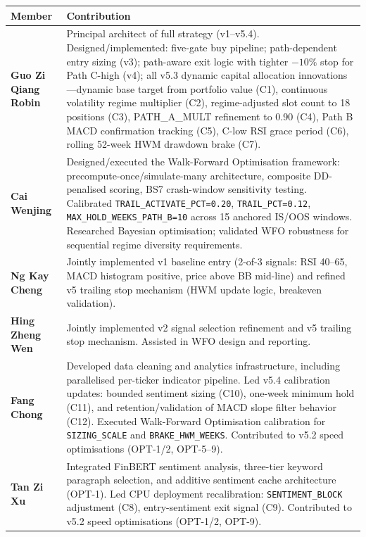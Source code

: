 \documentclass[11pt,twoside,a4paper]{article}
\begin{document}
{\small
\begin{tabular}{>{\raggedright\arraybackslash}p{3.8cm}%
                >{\raggedright\arraybackslash}p{10.5cm}}
\hline
Member & Contribution \\
\hline
\textbf{Guo Zi Qiang Robin} & Principal architect of full strategy (v1--v5.4). Designed/implemented: five-gate buy pipeline; path-dependent entry sizing (v3); path-aware exit logic with tighter $-10\%$ stop for Path C-high (v4); all v5.3 dynamic capital allocation innovations---dynamic base target from portfolio value (C1), continuous volatility regime multiplier (C2), regime-adjusted slot count to 18 positions (C3), PATH\_A\_MULT refinement to 0.90 (C4), Path B MACD confirmation tracking (C5), C-low RSI grace period (C6), rolling 52-week HWM drawdown brake (C7). \\[4pt]
\textbf{Cai Wenjing} & Designed/executed the Walk-Forward Optimisation framework: precompute-once/simulate-many architecture, composite DD-penalised scoring, BS7 crash-window sensitivity testing. Calibrated \texttt{TRAIL\_ACTIVATE\_PCT=0.20}, \texttt{TRAIL\_PCT=0.12}, \texttt{MAX\_HOLD\_WEEKS\_PATH\_B=10} across 15 anchored IS/OOS windows. Researched Bayesian optimisation; validated WFO robustness for sequential regime diversity requirements. \\[4pt]
\textbf{Ng Kay Cheng} & Jointly implemented v1 baseline entry (2-of-3 signals: RSI 40--65, MACD histogram positive, price above BB mid-line) and refined v5 trailing stop mechanism (HWM update logic, breakeven validation). \\[4pt]
\textbf{Hing Zheng Wen} & Jointly implemented v2 signal selection refinement and v5 trailing stop mechanism. Assisted in WFO design and reporting. \\[4pt]
\textbf{Fang Chong} & Developed data cleaning and analytics infrastructure, including parallelised per-ticker indicator pipeline. Led v5.4 calibration updates: bounded sentiment sizing (C10), one-week minimum hold (C11), and retention/validation of MACD slope filter behavior (C12). Executed Walk-Forward Optimisation calibration for \texttt{SIZING\_SCALE} and \texttt{BRAKE\_HWM\_WEEKS}. Contributed to v5.2 speed optimisations (OPT-1/2, OPT-5--9). \\[4pt]
\textbf{Tan Zi Xu} & Integrated FinBERT sentiment analysis, three-tier keyword paragraph selection, and additive sentiment cache architecture (OPT-1). Led CPU deployment recalibration: \texttt{SENTIMENT\_BLOCK} adjustment (C8), entry-sentiment exit signal (C9). Contributed to v5.2 speed optimisations (OPT-1/2, OPT-9). \\
\hline
\end{tabular}
}
\end{document}

